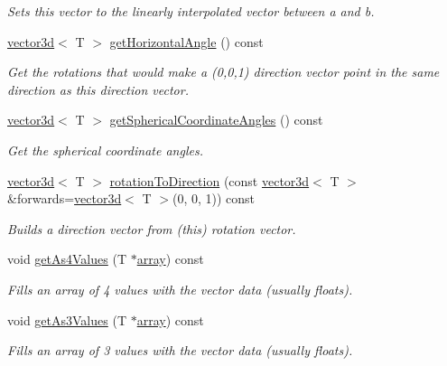 \begin{DoxyCompactItemize}
\begin{DoxyCompactList}\small\item\em Sets this vector to the linearly interpolated vector between a and b. \end{DoxyCompactList}\item 
\hyperlink{classirr_1_1core_1_1vector3d}{vector3d}$<$ T $>$ \hyperlink{classirr_1_1core_1_1vector3d_a2c622aa988b4ea1d2e381632f99f8015}{get\+Horizontal\+Angle} () const
\begin{DoxyCompactList}\small\item\em Get the rotations that would make a (0,0,1) direction vector point in the same direction as this direction vector. \end{DoxyCompactList}\item 
\hyperlink{classirr_1_1core_1_1vector3d}{vector3d}$<$ T $>$ \hyperlink{classirr_1_1core_1_1vector3d_ae65962051f40aabe305bbb71f1956b95}{get\+Spherical\+Coordinate\+Angles} () const
\begin{DoxyCompactList}\small\item\em Get the spherical coordinate angles. \end{DoxyCompactList}\item 
\hyperlink{classirr_1_1core_1_1vector3d}{vector3d}$<$ T $>$ \hyperlink{classirr_1_1core_1_1vector3d_a53d222e7aace72513210bddb2b25376f}{rotation\+To\+Direction} (const \hyperlink{classirr_1_1core_1_1vector3d}{vector3d}$<$ T $>$ \&forwards=\hyperlink{classirr_1_1core_1_1vector3d}{vector3d}$<$ T $>$(0, 0, 1)) const
\begin{DoxyCompactList}\small\item\em Builds a direction vector from (this) rotation vector. \end{DoxyCompactList}\item 
void \hyperlink{classirr_1_1core_1_1vector3d_aa661941fdf725c83dc560b15232fdf6e}{get\+As4\+Values} (T $\ast$\hyperlink{classirr_1_1core_1_1array}{array}) const
\begin{DoxyCompactList}\small\item\em Fills an array of 4 values with the vector data (usually floats). \end{DoxyCompactList}\item 
void \hyperlink{classirr_1_1core_1_1vector3d_af9e676bc10fe34e49e544373a33d7d21}{get\+As3\+Values} (T $\ast$\hyperlink{classirr_1_1core_1_1array}{array}) const
\begin{DoxyCompactList}\small\item\em Fills an array of 3 values with the vector data (usually floats). \end{DoxyCompactList}\item 

\end{DoxyCompactItemize}
